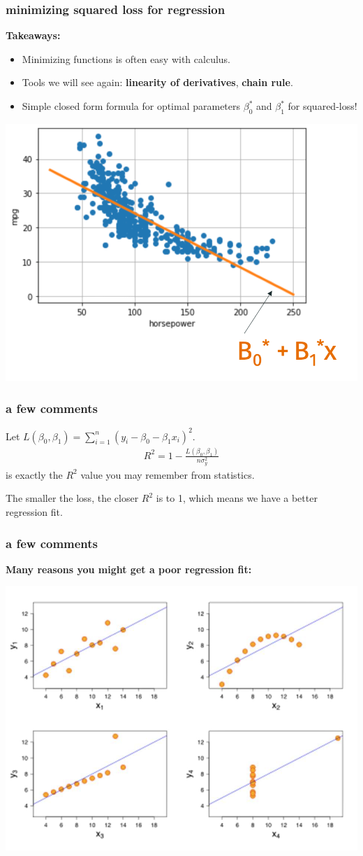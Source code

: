 \documentclass[handout,compress]{beamer}
\begin{document}
\begin{frame}[t]
	\frametitle{minimizing squared loss for regression}
	\textbf{Takeaways:}
	\begin{itemize}
		\item Minimizing functions is often easy with calculus. 
		\item Tools we will see again: \textbf{linearity of derivatives}, \textbf{chain rule}.
		\item Simple closed form formula for optimal parameters $\beta_0^*$ and $\beta_1^*$ for squared-loss!
	\end{itemize}
\begin{center}
	\includegraphics[width=.5\textwidth]{opt_final.png}
\end{center}
\end{frame}

\begin{frame}
	\frametitle{a few comments}
	Let $L(\beta_0,\beta_1) = \sum_{i=1}^n (y_i - \beta_0 - \beta_1x_i)^2$.
	\begin{align*}
	R^2 = 1 - \frac{L(\beta_0,\beta_1) }{n\sigma_y^2} 
	\end{align*}
	is exactly the $R^2$ value you may remember from statistics. 
	
	The smaller the loss, the closer $R^2$ is to 1, which means we have a better regression fit. 
\end{frame}

\begin{frame}[t]
	\frametitle{a few comments}
	\textbf{Many reasons you might get a poor regression fit:}
	\begin{center}
		\includegraphics[width=.7\textwidth]{poor_fit.png}
	\end{center}
\end{frame}
\end{document}
